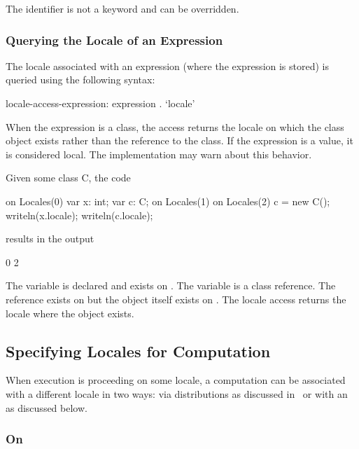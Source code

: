 The identifier  is not a keyword and can be overridden.

\subsubsection{Querying the Locale of an Expression}
\label{Querying_the_Locale_of_a_Variable}

The locale associated with an expression (where the expression is
stored) is queried using the following syntax:
\begin{syntax}
locale-access-expression:
  expression . `locale'
\end{syntax}
When the expression is a class, the access returns the locale on which
the class object exists rather than the reference to the class.  If
the expression is a value, it is considered local.  The implementation
may warn about this behavior.

\begin{example}
Given some class C, the code
\begin{chapel}
on Locales(0) {
  var x: int;
  var c: C;
  on Locales(1) {
    on Locales(2) {
      c = new C();
    }
    writeln(x.locale);
    writeln(c.locale);
  }
}
\end{chapel}
results in the output
\begin{chapel}
0
2
\end{chapel}
The variable  is declared and exists on .
The variable  is a class reference.  The reference exists
on  but the object itself exists
on .  The locale access returns the locale where the
object exists.
\end{example}

\subsection{Specifying Locales for Computation}
\label{Specifying_Locales_for_Computation}

When execution is proceeding on some locale, a computation can be
associated with a different locale in two ways: via distributions as
discussed in~ or with an  as
discussed below.

\subsubsection{On}
\label{On}

